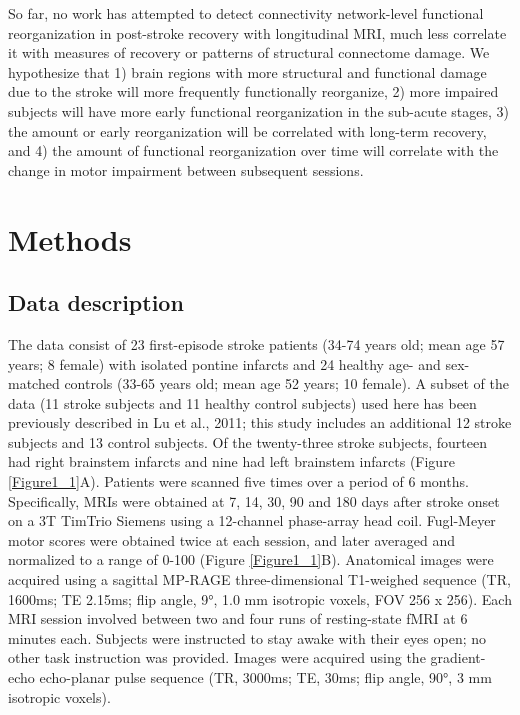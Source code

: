 \documentclass[phd,tocprelim]{cornell}
\begin{document}
 	So far, no work has attempted to detect connectivity network-level functional reorganization in post-stroke recovery with longitudinal MRI, much less correlate it with measures of recovery or patterns of structural connectome damage. We hypothesize that 1) brain regions with more structural and functional damage due to the stroke  will more frequently functionally reorganize, 2) more impaired subjects will have more early functional reorganization in the sub-acute stages, 3) the amount or early reorganization will be correlated with long-term recovery, and 4) the amount of functional reorganization over time will correlate with the change in motor impairment between subsequent sessions.	
	
\section{Methods}

	\subsection{Data description}
	 The data consist of 23 first-episode stroke patients (34-74 years old; mean age 57 years; 8 female) with isolated pontine infarcts and 24 healthy age- and sex-matched controls (33-65 years old; mean age 52 years; 10 female). A subset of the data (11 stroke subjects and 11 healthy control subjects) used here has been previously described in Lu et al., 2011; this study includes an additional 12 stroke subjects and 13 control subjects. Of the twenty-three stroke subjects, fourteen  had right brainstem infarcts and nine had left brainstem infarcts (Figure \ref{Figure1_1}A). Patients were scanned five times over a period of 6 months. Specifically, MRIs were obtained at 7, 14, 30, 90 and 180 days after stroke onset on a 3T TimTrio Siemens using a 12-channel phase-array head coil. Fugl-Meyer motor scores were obtained twice at each session, and later averaged and normalized to a range of 0-100 (Figure \ref{Figure1_1}B). Anatomical images were acquired using a sagittal MP-RAGE three-dimensional T1-weighed sequence (TR, 1600ms; TE 2.15ms; flip angle, 9°, 1.0 mm isotropic voxels, FOV 256 x 256). Each MRI session involved between two and four runs of resting-state fMRI at 6 minutes each. Subjects were instructed to stay awake with their eyes open; no other task instruction was provided. Images were acquired using the gradient-echo echo-planar pulse sequence (TR, 3000ms; TE, 30ms; flip angle, 90°, 3 mm isotropic voxels).
\end{document}
